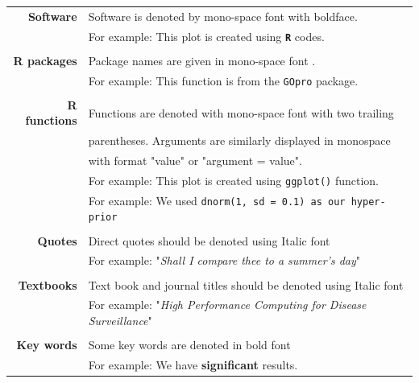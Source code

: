\begin{tabular}{rl}
	\textbf{Software} & Software is denoted by mono-space font with boldface.\\
	& For example: This plot is created using \texttt{\textbf{R}} codes. \\
	
	&\\ 
	
	\textbf{R packages} & Package names are given in mono-space font .\\
	& For example: This function is from the \texttt{GOpro} package. \\
	
	&\\ 
	
	\textbf{R functions} & Functions are denoted with mono-space font with two trailing \\
	& parentheses. Arguments are similarly displayed in monospace \\
	& with format "value" or "argument = value".\\
	& For example: This plot is created using \texttt{ggplot()} function.\\
	& For example: We used \texttt{dnorm(1, sd = 0.1) as our hyper-prior} \\
	
	&\\ 
	
	\textbf{Quotes} & Direct quotes should be denoted using Italic font\\
	& For example: "\textit{Shall I compare thee to a summer’s day}" \\
	
	&\\
	
	\textbf{Textbooks} & Text book and journal titles should be denoted using Italic font\\
	& For example: "\textit{High Performance Computing for Disease Surveillance}" \\
	
	&\\
	
	\textbf{Key words} & Some key words are denoted in bold font\\
	& For example: We have \textbf{significant} results.  \\
	
\end{tabular}